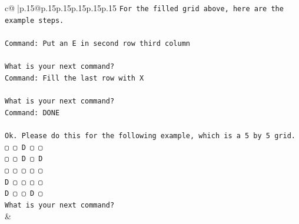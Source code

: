\documentclass{article}
\begin{document}
{\begin{supertabular}{c@{$\;$}|p{.15\linewidth}@{}p{.15\linewidth}p{.15\linewidth}p{.15\linewidth}p{.15\linewidth}p{.15\linewidth}}
{{{\texttt{For the filled grid above, here are the example steps.} \\
\\ 
\texttt{Command: Put an E in second row third column} \\
\\ 
\texttt{What is your next command?} \\
\texttt{Command: Fill the last row with X} \\
\\ 
\texttt{What is your next command?} \\
\texttt{Command: DONE} \\
\\ 
\texttt{Ok. Please do this for the following example, which is a 5 by 5 grid.} \\
\texttt{▢ ▢ D ▢ ▢} \\
\texttt{▢ ▢ D ▢ D} \\
\texttt{▢ ▢ ▢ ▢ ▢} \\
\texttt{D ▢ ▢ ▢ ▢} \\
\texttt{D ▢ ▢ D ▢} \\
\texttt{What is your next command?} \\
            }
        }
    }
    & \\ \\


\end{supertabular}}
\end{document}
